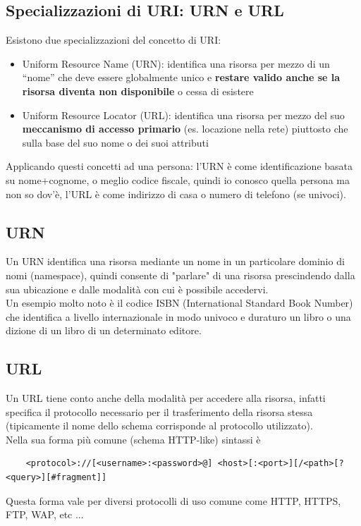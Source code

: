 \documentclass{article}
\begin{document}
\subsection{Specializzazioni di URI: URN e URL}
Esistono due specializzazioni del concetto di URI:
\begin{itemize}
    \item Uniform Resource Name (URN): identifica una risorsa per mezzo di un “nome” che deve essere globalmente unico e \textbf{restare valido anche se la risorsa diventa non disponibile} o cessa di esistere
    \item Uniform Resource Locator (URL): identifica una risorsa per mezzo del suo \textbf{meccanismo di accesso primario} (es. locazione nella rete) piuttosto che sulla base del suo nome o dei suoi attributi
\end{itemize}
Applicando questi concetti ad una persona: l'URN è come identificazione basata su
nome+cognome, o meglio codice fiscale, quindi io conosco quella persona ma non so dov'è, l'URL è come indirizzo di casa o numero di telefono (se univoci).



\subsection{URN}
Un URN identifica una risorsa mediante un nome in un particolare dominio di nomi (namespace), quindi consente di "parlare" di una risorsa prescindendo dalla sua ubicazione e dalle modalità con cui è possibile accedervi.\\
Un esempio molto noto è il codice ISBN (International Standard Book Number) che identifica a livello internazionale in modo univoco e duraturo un libro o una dizione di un libro di un determinato editore.


\subsection{URL}
Un URL tiene conto anche della modalità per accedere alla risorsa, infatti specifica il protocollo necessario per il trasferimento della risorsa stessa (tipicamente il nome dello schema corrisponde al protocollo utilizzato).\\
Nella sua forma più comune (schema HTTP-like) sintassi è
\begin{verbatim}
    <protocol>://[<username>:<password>@] <host>[:<port>][/<path>[?<query>][#fragment]]
\end{verbatim}
Questa forma vale per diversi protocolli di uso comune come HTTP, HTTPS, FTP, WAP, etc ...
\end{document}
